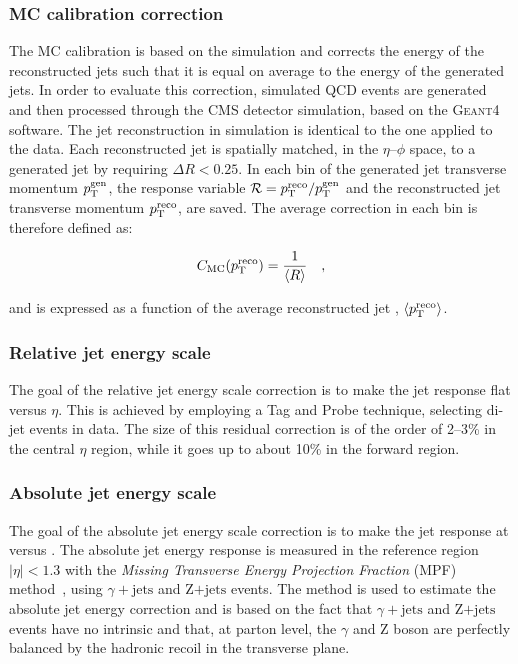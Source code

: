 \subsubsection{MC calibration correction}

The MC calibration is based on the simulation and corrects the energy of the reconstructed jets such that it is equal on average to the energy of the generated jets. In order to evaluate this correction, simulated QCD events are generated and then processed through the CMS detector simulation, based on the \textsc{Geant4} software. The jet reconstruction in simulation is identical to the one applied to the data. Each reconstructed jet is spatially matched, in the $\eta$--$\phi$ space, to a generated jet by requiring $\Delta R < 0.25$. In each bin of the generated jet transverse momentum $p_\mathrm{T}^\mathrm{gen}$, the response variable $\mathcal{R}=p_\mathrm{T}^\mathrm{reco}/p_\mathrm{T}^\mathrm{gen}$ and the reconstructed jet transverse momentum $p_\mathrm{T}^\mathrm{reco}$, are saved. The average correction in each bin is therefore defined as:

\begin{equation}
C_\mathrm{MC}(p_\mathrm{T}^\mathrm{reco}) = \frac{1}{\langle R \rangle} \quad,
\end{equation}

and is expressed as a function of the average reconstructed jet \pt, $\langle p_\mathrm{T}^\mathrm{reco} \rangle$.

\subsubsection{Relative jet energy scale}

The goal of the relative jet energy scale correction is to make the jet response flat versus $\eta$. This is achieved by employing a Tag and Probe technique, selecting di-jet events in data. The size of this residual correction is of the order of 2--3\% in the central $\eta$ region, while it goes up to about 10\% in the forward region.

\subsubsection{Absolute jet energy scale}

The goal of the absolute jet energy scale correction is to make the jet response at versus \pt. The absolute jet energy response is measured in the reference region $|\eta|<1.3$ with the \emph{Missing Transverse Energy Projection Fraction} (MPF) method~\cite{Abbott:1998xw}, using $\gamma+\mathrm{jets}$ and Z$+\mathrm{jets}$ events. The method is used to estimate the absolute jet energy correction and is based on the fact that $\gamma+\mathrm{jets}$ and Z$+\mathrm{jets}$ events have no intrinsic \MET and that, at parton level, the $\gamma$ and Z boson are perfectly balanced by the hadronic recoil in the transverse plane.

